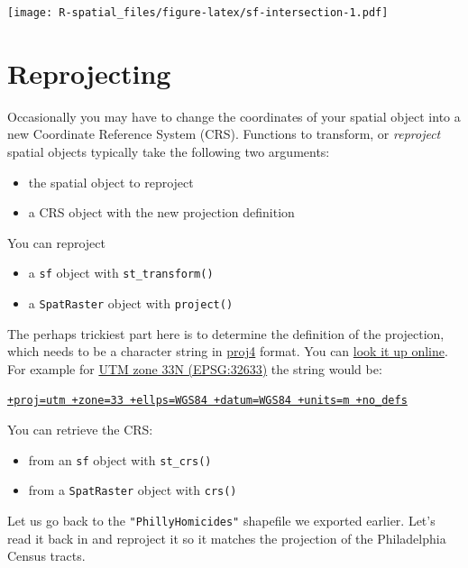 \documentclass[
]{book}
\providecommand{\tightlist}{%
  \setlength{\itemsep}{0pt}\setlength{\parskip}{0pt}}
\begin{document}
\texttt{[image: R-spatial\_files/figure-latex/sf-intersection-1.pdf]}

\hypertarget{reprojecting}{%
\section{Reprojecting}\label{reprojecting}}

Occasionally you may have to change the coordinates of your spatial object into a new Coordinate Reference System (CRS). Functions to transform, or \emph{reproject} spatial objects typically take the following two arguments:

\begin{itemize}
\tightlist
\item
  the spatial object to reproject
\item
  a CRS object with the new projection definition
\end{itemize}

You can reproject

\begin{itemize}
\tightlist
\item
  a \texttt{sf} object with \texttt{st\_transform()}\\
\item
  a \texttt{SpatRaster} object with \texttt{project()}
\end{itemize}

The perhaps trickiest part here is to determine the definition of the projection, which needs to be a character string in \href{http://trac.osgeo.org/proj/}{proj4} format. You can \href{http://www.spatialreference.org}{look it up online}. For example for \href{http://spatialreference.org/ref/epsg/wgs-84-utm-zone-33n/}{UTM zone 33N (EPSG:32633)} the string would be:

\href{http://spatialreference.org/ref/epsg/wgs-84-utm-zone-33n/proj4js/}{\texttt{+proj=utm\ +zone=33\ +ellps=WGS84\ +datum=WGS84\ +units=m\ +no\_defs}}

You can retrieve the CRS:

\begin{itemize}
\tightlist
\item
  from an \texttt{sf} object with \texttt{st\_crs()}
\item
  from a \texttt{SpatRaster} object with \texttt{crs()}
\end{itemize}

Let us go back to the \texttt{"PhillyHomicides"} shapefile we exported earlier. Let's read it back in and reproject it so it matches the projection of the Philadelphia Census tracts.
\end{document}
